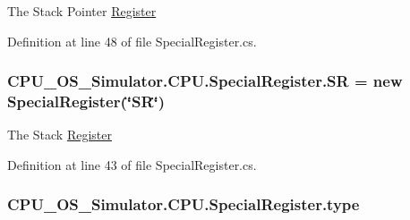 The Stack Pointer \hyperlink{class_c_p_u___o_s___simulator_1_1_c_p_u_1_1_register}{Register} 



Definition at line 48 of file Special\+Register.\+cs.

\hypertarget{class_c_p_u___o_s___simulator_1_1_c_p_u_1_1_special_register_a556243e1c3c891e685bf884771c1575c}{}
\subsubsection[{S\+R}]{ C\+P\+U\+\_\+\+O\+S\+\_\+\+Simulator.\+C\+P\+U.\+Special\+Register.\+S\+R = new {\bf Special\+Register}(\char`\"{}S\+R\char`\"{})\hspace{0.3cm}{\ttfamily [static]}}\label{class_c_p_u___o_s___simulator_1_1_c_p_u_1_1_special_register_a556243e1c3c891e685bf884771c1575c}


The Stack \hyperlink{class_c_p_u___o_s___simulator_1_1_c_p_u_1_1_register}{Register} 



Definition at line 43 of file Special\+Register.\+cs.

\hypertarget{class_c_p_u___o_s___simulator_1_1_c_p_u_1_1_special_register_aae2bca6c1354013cca156bd19c30640d}{}
\subsubsection[{type}]{ C\+P\+U\+\_\+\+O\+S\+\_\+\+Simulator.\+C\+P\+U.\+Special\+Register.\+type\hspace{0.3cm}{\ttfamily [private]}}\label{class_c_p_u___o_s___simulator_1_1_c_p_u_1_1_special_register_aae2bca6c1354013cca156bd19c30640d}




